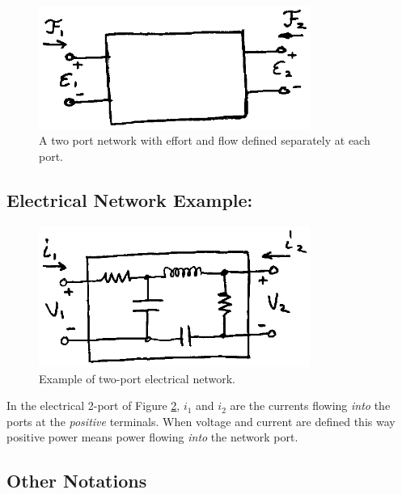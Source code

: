 \begin{figure}[p]	%
\centering \includegraphics[width=3.5in]{figs14/00307.eps}
\caption{A two port network with effort and flow defined separately at each port.}\label{GenericTwoPort}	%
\end{figure}	%


\subsection{Electrical Network Example: }


\begin{figure}[p]	%
\centering \includegraphics[width=3.5in]{figs14/00308.eps}
\caption{Example of two-port electrical network.}\label{ElectricTwoPort}	%
\end{figure}	%

In the electrical 2-port of Figure \ref{ElectricTwoPort}, $i_1$ and $i_2$ are the currents flowing {\it into} the ports at the {\it positive} terminals. When voltage and current are defined this way positive power means power flowing {\it into} the network port.





\subsection{Other Notations}

